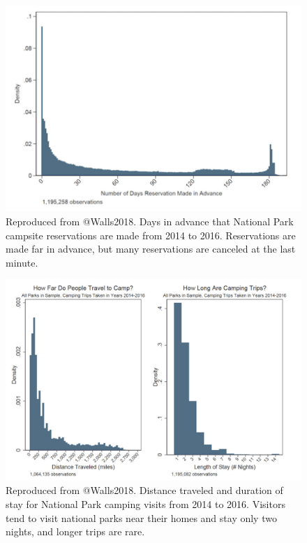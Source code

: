 \documentclass[
]{book}
\begin{document}
\begin{figure}
\includegraphics[width=12in]{images/problem_statement_figure_2} \caption{Reproduced from @Walls2018. Days in advance that National Park campsite reservations are made from 2014 to 2016. Reservations are made far in advance, but many reservations are canceled at the last minute.}\label{fig:fig2}
\end{figure}

\begin{figure}
\includegraphics[width=20in]{images/problem_statement_figure_3} \caption{Reproduced from @Walls2018. Distance traveled and duration of stay for National Park camping visits from 2014 to 2016. Visitors tend to visit national parks near their homes and stay only two nights, and longer trips are rare.}\label{fig:fig3}
\end{figure}
\end{document}
